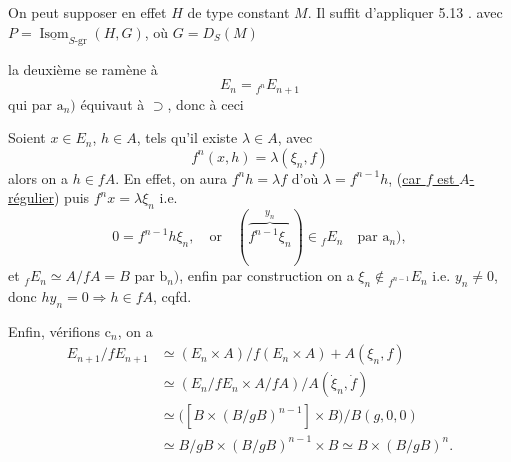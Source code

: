 On peut supposer en effet  $H$ de type constant $M$. Il suffit d'appliquer 5.13 . avec $P=\underline{\operatorname{Isom}}_{S\text{-gr}}(H,G)$, où $G=D_S(M)$\handwritten{,}

la deuxième  se ramène à
\[
E_n={}_{f^n}E_{n+1}
\]
qui par $\mathrm a_n)$ équivaut à $\supset$, donc à ceci

Soient $x\in E_n$, $h\in A$,  tels qu'il existe $\lambda\in A$, avec
\[
f^n(x,h)=\lambda(\xi_n,f)
\]
alors on a $h\in fA$. En effet, on aura $f^nh=\lambda f$ d'où $\lambda=f^{n-1}h$, (\uline{car $f$ est $A$-régulier}) puis $f^nx=\lambda\xi_n$  i.e.
\[
0=f^{n-1}h\xi_n,\quad\text{or}\quad (\overbrace{f^{n-1}\xi_n}^{y_n})\in {}_fE_n\quad\text{par }\mathrm a_n),
\]
 et $ {}_fE_n\simeq A/fA=B$ par $\mathrm b_n)$,  enfin par construction on a $\xi_n\notin{}_{f^{n-1}}E_n$ i.e.  $y_n\neq0$, donc $hy_n=0\Longrightarrow h\in fA$, cqfd.

Enfin, vérifions $\mathrm c_n$, on a
\[
\begin{aligned}
E_{n+1}/fE_{n+1}&\simeq(E_n\times A)/f(E_n\times A)+A(\xi_n,f)\\
&\simeq(E_n/fE_n\times A/fA)/A(\dot{\xi}_n,\dot f)\\
&\simeq\bigl([B\times(B/gB)^{n-1}]\times B\bigr)/B(g,0,0)\\
&\simeq B/gB\times(B/gB)^{n-1}\times B\simeq B\times(B/gB)^n.
\end{aligned}
\]

